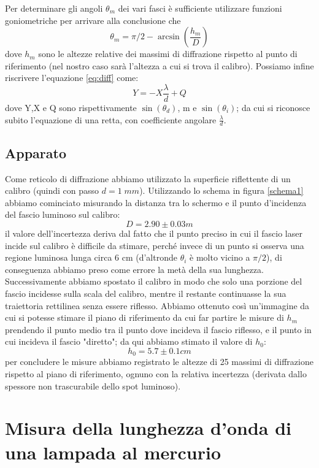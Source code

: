 \documentclass[10pt, a4paper, italian]{article}
\begin{document}
Per determinare gli angoli $\theta _m$ dei vari fasci è sufficiente utilizzare funzioni goniometriche per arrivare alla conclusione che
\begin{equation}
\theta _m=\pi /2 - \arcsin(\frac{h_m}{D})
\end{equation}
dove $h_m$ sono le altezze relative dei massimi di diffrazione rispetto al punto di riferimento (nel nostro caso sarà l'altezza a cui si trova il calibro).
Possiamo infine riscrivere l'equazione \ref{eq:diff} come:
\begin{equation}
Y= -X \frac{\lambda}{d} +Q
\label{eq:fit}
\end{equation}
dove Y,X e Q sono rispettivamente $\sin(\theta _d)$, m e $\sin(\theta _i)$; da cui si riconosce subito l'equazione di una retta, con coefficiente angolare $\frac{\lambda}{d}$.
\subsection{Apparato}
Come reticolo di diffrazione abbiamo utilizzato la superficie riflettente di un calibro (quindi con passo $d=1 \; mm$).
Utilizzando lo schema in figura \ref{schema1} abbiamo cominciato misurando la distanza tra lo schermo e il punto d'incidenza del fascio luminoso sul calibro:
\[
D=2.90 \pm 0.03 m
\]
il valore dell'incertezza deriva dal fatto che il punto preciso in cui il fascio laser incide sul calibro è difficile da stimare, perché invece di un punto si osserva una regione luminosa lunga circa 6 cm (d'altronde $\theta _i$ è molto vicino a $\pi /2$), di conseguenza abbiamo preso come errore la metà della sua lunghezza.
Successivamente abbiamo spostato il calibro in modo che solo una porzione del fascio incidesse sulla scala del calibro, mentre il restante continuasse la sua traiettoria rettilinea senza essere riflesso.
Abbiamo ottenuto così un'immagine da cui si potesse stimare il piano di riferimento da cui far partire le misure di $h_m$ prendendo il punto medio tra il punto dove incideva il fascio riflesso, e il punto in cui incideva il fascio "diretto"; da qui abbiamo stimato il valore di $h_0$:
\[
h_0=5.7 \pm 0.1 cm
\]
per concludere le misure abbiamo registrato le altezze di 25 massimi di diffrazione rispetto al piano di riferimento, ognuno con la relativa incertezza (derivata dallo spessore non trascurabile dello spot luminoso).

\section{Misura della lunghezza d'onda di una lampada al mercurio}
\end{document}
